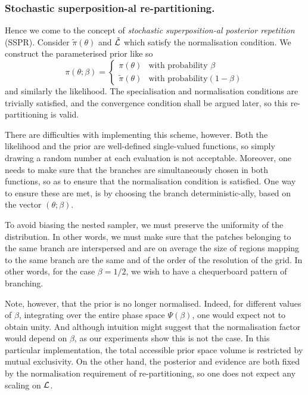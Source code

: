 \documentclass[usenatbib]{mnras}
\begin{document}
\subsubsection{Stochastic superposition-al re-partitioning.}
\label{sec:org998c17d}

Hence we come to the concept of \emph{stochastic superposition-al
posterior repetition} (SSPR). Consider \(\tilde{\pi}(\theta)\) and
\({\cal \tilde{L}}\) which satisfy the normalisation
condition. We construct the parameterised prior like so
\begin{equation}
  \pi(\theta; \beta)  = \begin{cases}
	\pi(\theta) & \text{with probability } \beta\\
	\tilde{\pi}(\theta) & \text{with probability} (1- \beta)
	\end{cases}
\end{equation}
and similarly the likelihood.  The specialisation and
normalisation conditions are trivially satisfied, and the
convergence condition shall be argued later, so this
re-partitioning is valid.

There are difficulties with implementing this scheme,
however. Both the likelihood and the prior are well-defined
single-valued functions, so simply drawing a random number at each
evaluation is not acceptable. Moreover, one needs to make sure
that the branches are simultaneously chosen in both functions, so
as to ensure that the normalisation condition is satisfied. One
way to ensure these are met, is by choosing the branch
deterministic-ally, based on the vector \((\theta; \beta)\). 

To avoid biasing the nested sampler, we must preserve the
uniformity of the distribution. In other words, we must make sure
that the patches belonging to the same branch are interspersed and
are on average the size of regions mapping to the same branch are
the same and of the order of the resolution of the grid. In other
words, for the case \(\beta=1/2\), we wish to have a chequerboard
pattern of branching. 

Note, however, that the prior is no longer normalised. Indeed, for
different values of \(\beta\), integrating over the entire phase
space \(\Psi(\beta)\), one would expect not to obtain unity. And
although intuition might suggest that the normalisation factor
would depend on \(\beta\), as our experiments show this is not the
case. In this particular implementation, the total accessible
prior space volume is restricted by mutual exclusivity. On the
other hand, the posterior and evidence are both fixed by the
normalisation requirement of re-partitioning, so one does not
expect any scaling on \({\cal L}\). 
\end{document}
